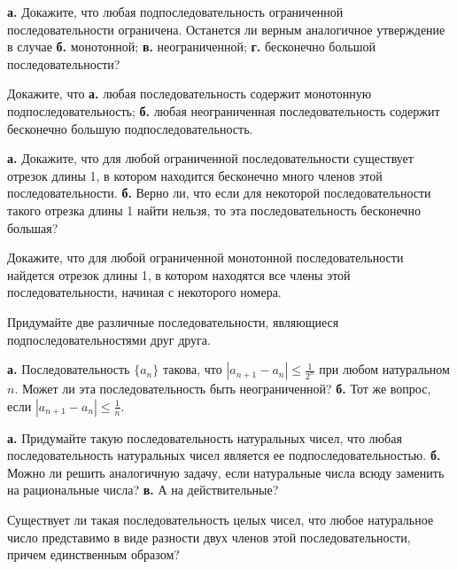 \documentclass[a4paper, 12pt, num=25]{listok}
\begin{document}
\begin{problem}
	\textbf{а.} Докажите, что любая подпоследовательность ограниченной последовательности ограничена.
	Останется ли верным аналогичное утверждение в случае \textbf{б.} монотонной; \textbf{в.} неограниченной; \textbf{г.} бесконечно большой последовательности?
\end{problem}
\begin{problem}
	Докажите, что \textbf{а.} любая последовательность содержит монотонную подпоследовательность;
	\textbf{б.} любая неограниченная последовательность содержит бесконечно большую подпоследовательность.
\end{problem}
\begin{problem}
	\textbf{а.} Докажите, что для любой ограниченной последовательности существует отрезок длины 1,
	в котором находится бесконечно много членов этой последовательности.
	\textbf{б.} Верно ли, что если для некоторой последовательности такого отрезка длины 1 найти нельзя, то эта последовательность  бесконечно большая?
\end{problem}
\begin{problem}
	Докажите, что для любой ограниченной монотонной последовательности найдется отрезок длины 1,
	в котором находятся все члены этой последовательности, начиная с некоторого номера.
\end{problem}
\begin{problem}
	Придумайте две различные последовательности, являющиеся подпоследовательностями друг друга.
\end{problem}
\begin{problem}
	\textbf{а.} Последовательность $\{a_n\}$ такова, что $|a_{n+1} - a_n| \le \frac1{2^n}$ при любом натуральном $n$.
	Может ли эта последовательность быть неограниченной?
	\textbf{б.} Тот же вопрос, если $|a_{n+1} - a_n| \le \frac1n$.
\end{problem}
\begin{problem}
	\textbf{а.} Придумайте такую последовательность натуральных чисел, что любая последовательность натуральных чисел является ее подпоследовательностью.
	\textbf{б.} Можно ли решить аналогичную задачу, если натуральные числа всюду заменить на рациональные числа?
	\textbf{в.} А на действительные?
\end{problem}
\begin{problem}
	Существует ли такая последовательность целых чисел, что любое натуральное число представимо в виде разности двух членов этой последовательности,
	причем единственным образом?
\end{problem}
\end{document}
